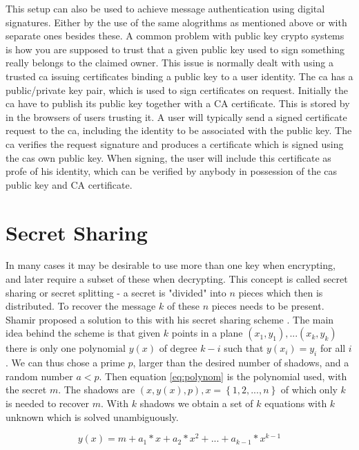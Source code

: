 This setup can also be used to achieve message authentication using digital signatures. Either by the use of the same alogrithms as mentioned above or with separate ones besides these. A common problem with public key crypto systems is how you are supposed to trust that a given public key used to sign something really belongs to the claimed owner. This issue is normally dealt with using a trusted \gls{ca} issuing certificates binding a public key to a user identity. The \gls{ca} has a public/private key pair, which is used to sign certificates on request. Initially the \gls{ca} have to publish its public key together with a CA certificate. This is stored by in the browsers of users trusting it. A user will typically send a signed certificate request to the \gls{ca}, including the identity to be associated with the public key. The \gls{ca} verifies the request signature and produces a certificate which is signed using the \glspl{ca} own public key. When signing, the user will include this certificate as profe of his identity, which can be verified by anybody in possession of the \glspl{ca} public key and CA certificate. 



\section{Secret Sharing}\label{sec:secret_sharing}
In many cases it may be desirable to use more than one key when encrypting, and later require a subset of these when decrypting. This concept is called secret sharing or secret splitting - a secret is "divided" into $n$ pieces which then is distributed. To recover the message $k$ of these $n$ pieces needs to be present. Shamir proposed a solution to this with his secret sharing scheme \cite{shamir_share}. The main idea behind the scheme is that given $k$ points in a plane $(x_1,y_1), ... (x_k,y_k)$ there is only one polynomial $y(x)$ of degree $k-i$ such that $y(x_i) = y_i$ for all $i$. We can thus chose a prime $p$, larger than the desired number of shadows, and a random number $a < p$. Then equation \ref{eq:polynom} is the polynomial used, with the secret $m$. The shadows are $(x, y(x), p) , x=\left\{ {1,2, ... ,n}\right\}$ of which only $k$ is needed to recover $m$. With $k$ shadows we obtain a set of $k$ equations with $k$ unknown which is solved unambiguously.

\begin{equation}
 y(x) = m + a_1*x + a_2*x^2 + ... + a_{k-1} * x^{k-1} 
\end{equation}\label{eq:polynom}


